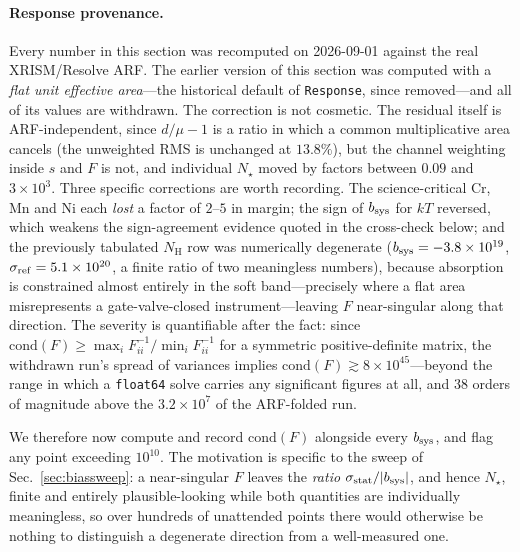 \documentclass[11pt,a4paper]{article}
\newcommand{\nh}{N_{\mathrm{H}}}
\newcommand{\code}[1]{\texttt{#1}}
\begin{document}
\paragraph{Response provenance.} Every number in this section was recomputed on
2026-09-01 against the real XRISM/Resolve ARF. The earlier version of this
section was computed with a \emph{flat unit effective area}---the historical
default of \code{Response}, since removed---and all of its values are withdrawn.
The correction is not cosmetic. The residual itself is ARF-independent, since
$d/\mu-1$ is a ratio in which a common multiplicative area cancels (the
unweighted RMS is unchanged at $13.8\%$), but the channel weighting inside $s$
and $F$ is not, and individual $N_\star$ moved by factors between $0.09$ and
$3\times10^{3}$. Three specific corrections are worth recording. The
science-critical Cr, Mn and Ni each \emph{lost} a factor of $2$--$5$ in margin;
the sign of $b_{\rm sys}$ for $kT$ reversed, which weakens the sign-agreement
evidence quoted in the cross-check below; and the previously tabulated $\nh$ row
was numerically degenerate ($b_{\rm sys}=-3.8\times10^{19}$,
$\sigma_{\rm ref}=5.1\times10^{20}$, a finite ratio of two meaningless numbers),
because absorption is constrained almost entirely in the soft band---precisely
where a flat area misrepresents a gate-valve-closed instrument---leaving $F$
near-singular along that direction. The severity is quantifiable after the
fact: since $\mathrm{cond}(F)\geq\max_i F^{-1}_{ii}/\min_i F^{-1}_{ii}$ for a
symmetric positive-definite matrix, the withdrawn run's spread of variances
implies $\mathrm{cond}(F)\gtrsim8\times10^{45}$---beyond the range in which a
\code{float64} solve carries any significant figures at all, and $38$ orders of
magnitude above the $3.2\times10^{7}$ of the ARF-folded run.

We therefore now compute and record $\mathrm{cond}(F)$ alongside every
$b_{\rm sys}$, and flag any point exceeding $10^{10}$. The motivation is
specific to the sweep of Sec.~\ref{sec:biassweep}: a near-singular $F$ leaves
the \emph{ratio} $\sigma_{\rm stat}/|b_{\rm sys}|$, and hence $N_\star$, finite
and entirely plausible-looking while both quantities are individually
meaningless, so over hundreds of unattended points there would otherwise be
nothing to distinguish a degenerate direction from a well-measured one.
\end{document}
